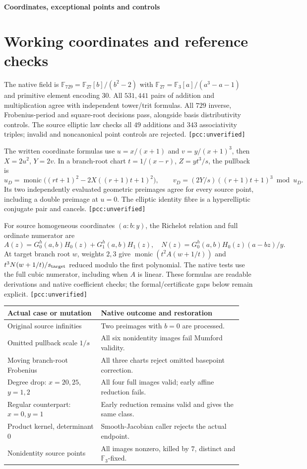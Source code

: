 \documentclass[10pt,a4paper]{article}
\newcommand{\uv}{\texttt{[pcc:unverified]}}
\begin{document}
\newpage
{\Large\bfseries Coordinates, exceptional points and controls}\par

\section{Working coordinates and reference checks}
The native field is $\mathbb F_{729}=\mathbb F_{27}[b]/(b^2-2)$ with
$\mathbb F_{27}=\mathbb F_3[a]/(a^3-a-1)$ and primitive element encoding
$30$. All $531{,}441$ pairs of addition and multiplication agree with
independent tower/trit formulas. All $729$ inverse, Frobenius-period and
square-root decisions pass, alongside basis distributivity controls.
The source elliptic law checks all $49$ additions and $343$ associativity
triples; invalid and noncanonical point controls are rejected. \uv

The written coordinate formulas use $u=x/(x+1)$ and $v=y/(x+1)^3$, then
$X=2u^2$, $Y=2v$. In a branch-root chart
$t=1/(x-r)$, $Z=yt^3/s$, the pullback is
\[
 u_D=\operatorname{monic}\big((rt+1)^2-2X((r+1)t+1)^2\big),\qquad
 v_D=(2Y/s)((r+1)t+1)^3\bmod u_D.
\]
Its two independently evaluated geometric preimages agree for every source
point, including a double preimage at $u=0$. The elliptic identity fibre is
a hyperelliptic conjugate pair and cancels. \uv

For source homogeneous coordinates $(a:b:y)$, the Richelot relation and
full ordinate numerator are
\[
 A(z)=G_0^h(a,b)H_0(z)+G_1^h(a,b)H_1(z),\quad
 N(z)=G_0^h(a,b)H_0(z)(a-bz)/y.
\]
At target branch root $w$, weights $2,3$ give
$\operatorname{monic}(t^2A(w+1/t))$ and
$t^3N(w+1/t)/s_{\rm target}$ reduced modulo the first polynomial.
The native tests use the full cubic numerator, including when $A$ is linear.
These formulas are readable derivations and native coefficient checks;
the formal/certificate gaps below remain explicit. \uv

\begin{center}\begin{tabular}{@{}L{0.37\linewidth}L{0.57\linewidth}@{}}
\toprule
Actual case or mutation & Native outcome and restoration\\\midrule
Original source infinities & Two preimages with $b=0$ are processed.\\
Omitted pullback scale $1/s$ & All six nonidentity images fail Mumford validity.\\
Moving branch-root Frobenius & All three charts reject omitted basepoint correction.\\
Degree drop: $x=20,25$, $y=1,2$ & All four full images valid; early affine reduction fails.\\
Regular counterpart: $x=0,y=1$ & Early reduction remains valid and gives the same class.\\
Product kernel, determinant $0$ & Smooth-Jacobian caller rejects the actual endpoint.\\
Nonidentity source points & All images nonzero, killed by $7$, distinct and $\mathbb F_3$-fixed.\\
\bottomrule\end{tabular}\end{center}
\end{document}
